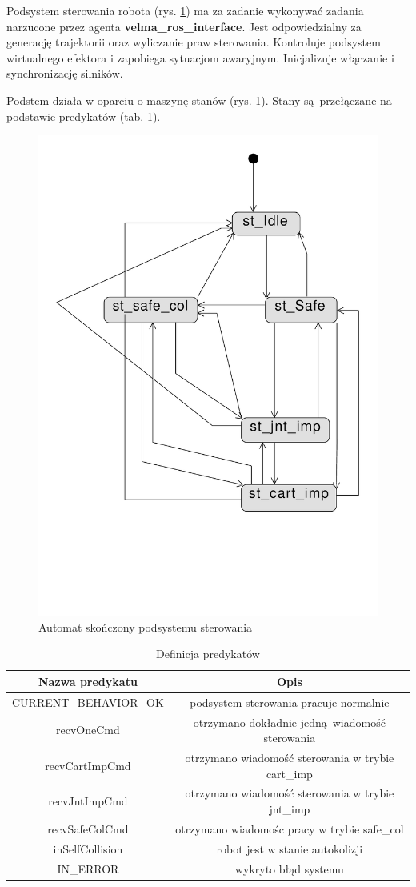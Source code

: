 \documentclass[]{article}
\begin{document}
Podsystem sterowania robota (rys. \ref{fig:fsm}) ma za zadanie wykonywać zadania narzucone przez agenta \textbf{velma\_ros\_interface}. Jest odpowiedzialny za generację trajektorii oraz wyliczanie praw sterowania. Kontroluje podsystem wirtualnego efektora i zapobiega sytuacjom awaryjnym. Inicjalizuje włączanie i synchronizację silników.

Podstem działa w oparciu o maszynę stanów (rys. \ref{fig:fsm}). Stany są przełączane na podstawie predykatów (tab. \ref{tab:pred}).

	\begin{figure}[H]
		\centering
		\includegraphics[width=0.4\linewidth]{fsm_cs}
		\caption{Automat skończony podsystemu sterowania}
		\label{fig:fsm}
	\end{figure}

	\begin{table}[H]
		\begin{tabular}{||c|c||}
		\hline
		Nazwa predykatu & Opis \\
		\hline \hline
		CURRENT\_BEHAVIOR\_OK & podsystem sterowania pracuje normalnie \\
		recvOneCmd & otrzymano dokładnie jedną wiadomość sterowania \\
		recvCartImpCmd & otrzymano wiadomość sterowania w trybie cart\_imp \\
		recvJntImpCmd & otrzymano wiadomość sterowania w trybie jnt\_imp \\
		recvSafeColCmd & otrzymano wiadomośc pracy w trybie safe\_col \\
		inSelfCollision & robot jest w stanie autokolizji \\
		IN\_ERROR & wykryto błąd systemu \\
		\hline
		\end{tabular}
		\caption{Definicja predykatów}
		\label{tab:pred}
	\end{table}
\end{document}
